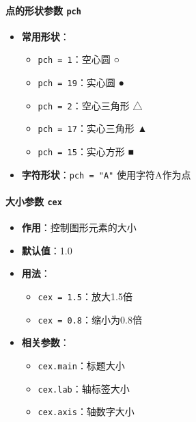 \documentclass[
  twoside]{book}
\providecommand{\tightlist}{%
  \setlength{\itemsep}{0pt}\setlength{\parskip}{0pt}}
\begin{document}
\hypertarget{ux70b9ux7684ux5f62ux72b6ux53c2ux6570-pch}{%
\paragraph{\texorpdfstring{点的形状参数 \texttt{pch}}{点的形状参数 pch}}\label{ux70b9ux7684ux5f62ux72b6ux53c2ux6570-pch}}

\begin{itemize}
\tightlist
\item
  \textbf{常用形状}：

  \begin{itemize}
  \tightlist
  \item
    \texttt{pch\ =\ 1}：空心圆 ○
  \item
    \texttt{pch\ =\ 19}：实心圆 ●
  \item
    \texttt{pch\ =\ 2}：空心三角形 △
  \item
    \texttt{pch\ =\ 17}：实心三角形 ▲
  \item
    \texttt{pch\ =\ 15}：实心方形 ■
  \end{itemize}
\item
  \textbf{字符形状}：\texttt{pch\ =\ "A"} 使用字符A作为点
\end{itemize}

\hypertarget{ux5927ux5c0fux53c2ux6570-cex}{%
\paragraph{\texorpdfstring{大小参数 \texttt{cex}}{大小参数 cex}}\label{ux5927ux5c0fux53c2ux6570-cex}}

\begin{itemize}
\tightlist
\item
  \textbf{作用}：控制图形元素的大小
\item
  \textbf{默认值}：1.0
\item
  \textbf{用法}：

  \begin{itemize}
  \tightlist
  \item
    \texttt{cex\ =\ 1.5}：放大1.5倍
  \item
    \texttt{cex\ =\ 0.8}：缩小为0.8倍
  \end{itemize}
\item
  \textbf{相关参数}：

  \begin{itemize}
  \tightlist
  \item
    \texttt{cex.main}：标题大小
  \item
    \texttt{cex.lab}：轴标签大小
  \item
    \texttt{cex.axis}：轴数字大小
  \end{itemize}
\end{itemize}
\end{document}
